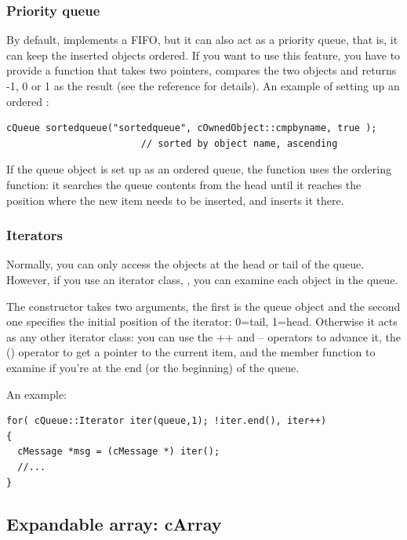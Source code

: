 \subsubsection{Priority queue}


By default,  implements a FIFO, but it can also act as
a priority queue, that is, it can keep the inserted objects
ordered.  If you want to use this feature, you have
to provide a function that takes two  pointers,
compares the two objects and returns -1, 0 or 1 as the result (see the
reference for details).  An example of setting up an ordered
:

\begin{verbatim}
cQueue sortedqueue("sortedqueue", cOwnedObject::cmpbyname, true );
                        // sorted by object name, ascending
\end{verbatim}


If the queue object is set up as an ordered queue, the 
function uses the ordering function: it searches the queue contents
from the head until it reaches the position where the new item
needs to be inserted, and inserts it there.


\subsubsection{Iterators}


Normally, you can only access the objects at the head or tail of the
queue. However, if you use an iterator class, ,
you can examine each object in the queue.

The  constructor takes two arguments, the first
is the queue object and the second one specifies the initial position
of the iterator: 0=tail, 1=head. Otherwise it acts as any other
{\opp} iterator class: you can use the ++ and -- operators to advance
it, the () operator to get a pointer to the current item, and the
 member function to examine if you're at the end (or the
beginning) of the queue.


An example:

\begin{verbatim}
for( cQueue::Iterator iter(queue,1); !iter.end(), iter++)
{
  cMessage *msg = (cMessage *) iter();
  //...
}
\end{verbatim}




\subsection{Expandable array: cArray}


